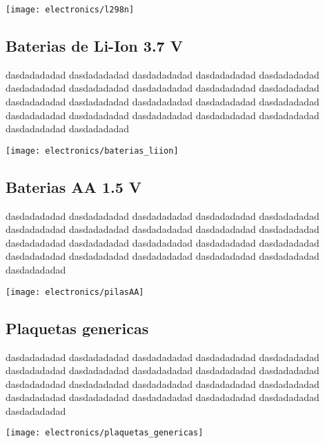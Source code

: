 \begin{center}
    \centering
    \texttt{[image: electronics/l298n]}
    \label{fig:l298n}
\end{center}

\subsection{Baterias de Li-Ion 3.7 V}
dasdadadadad dasdadadadad dasdadadadad dasdadadadad dasdadadadad dasdadadadad dasdadadadad dasdadadadad dasdadadadad dasdadadadad dasdadadadad dasdadadadad dasdadadadad dasdadadadad dasdadadadad dasdadadadad dasdadadadad dasdadadadad dasdadadadad dasdadadadad dasdadadadad dasdadadadad 

\begin{center}
    \centering
    \texttt{[image: electronics/baterias\_liion]}
    \label{fig:baterias_liion}
\end{center}

\subsection{Baterias AA 1.5 V}

dasdadadadad dasdadadadad dasdadadadad dasdadadadad dasdadadadad dasdadadadad dasdadadadad dasdadadadad dasdadadadad dasdadadadad dasdadadadad dasdadadadad dasdadadadad dasdadadadad dasdadadadad dasdadadadad dasdadadadad dasdadadadad dasdadadadad dasdadadadad dasdadadadad 
\begin{center}
    \centering
    \texttt{[image: electronics/pilasAA]}
    \label{fig:pilasAA}
\end{center}


\subsection{Plaquetas genericas}
dasdadadadad dasdadadadad dasdadadadad dasdadadadad dasdadadadad dasdadadadad dasdadadadad dasdadadadad dasdadadadad dasdadadadad dasdadadadad dasdadadadad dasdadadadad dasdadadadad dasdadadadad dasdadadadad dasdadadadad dasdadadadad dasdadadadad dasdadadadad dasdadadadad 

\begin{center}
    \centering
    \texttt{[image: electronics/plaquetas\_genericas]}
    \label{fig:plaquetas_genericas}
\end{center}


